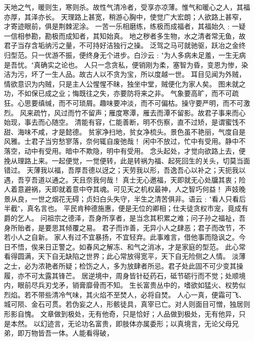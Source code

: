 \documentclass[12pt,UTF8]{ctexbook}
\begin{document}
天地之气，暖则生，寒则杀。故性气清冷者，受享亦凉薄。惟气和暖心之人，其福亦厚，其泽亦长。
天理路上甚宽，稍游心胸中，使觉广大宏朗；人欲路上甚窄，才寄迹眼前，俱是荆棘泥涂。
一苦一乐相磨练，练极而成福者，其福始久﹕一疑一信相参勘，勘极而成知者，其知始真。
地之秽者多生物，水之清者常无鱼，故君子当存含垢纳污之量，不可持好洁独行之操。
泛驾之马可就驰驱，跃冶之金终归型范。只一优游不振，便终身无个进步。白沙云﹕"为人多病未足羞，一生无病是吾忧。"真确实之论也。
人只一念贪私，便销刚为柔，塞智为昏，变恩为惨，染洁为污，坏了一生人品。故古人以不贪为宝，所以度越一世。
耳目见闻为外贼，情欲意识为内贼，只是主人公惺惺不昧，独坐中堂，贼便化为家人矣。
图未就之功，不如保已成之业；悔既往之失，亦要防将来之非。
气象要高旷，而不可疏狂。心思要缜缄，而不可琐屑。趣味要冲淡，而不可偏枯。操守要严明，而不可激烈。
风来疏竹，风过而竹不留声；雁度寒潭，雁去而潭不留影。故君子事来而心始现，事去而心随空。
清能有容，仁能善断，明不伤察，直不过矫，是谓蜜饯不甜、海味不咸，才是懿德。
贫家净扫地，贫女净梳头。景色虽不艳丽，气度自是风雅。士君子当穷愁寥落，奈何辄自废弛哉！
闲中不放过，忙中有受用。静中不落空，动中有受用。暗中不欺隐，明中有受用。
念头起处，才觉向欲路上去，便挽从理路上来。一起便觉，一觉便转，此是转祸为福、起死回生的关头，切莫当面错过。
天薄我以福，吾厚吾德以迓之；天劳我以形，吾逸吾心以补之；天扼我以遇，吾亨吾道以通之。天且奈我何哉！
真士无心邀福，天即就无心处牖其衷；险人着意避祸，天即就着意中夺其魂。可见天之机权最神，人之智巧何益！
声妓晚景从良，一世之烟花无碍；贞妇白头失守，半生之清苦俱非。语云﹕"看人只看后半截"，真名言也。
平民肯种德施惠，便是无位的卿相；仕夫徒贪权市宠，竟成有爵的乞人。
问祖宗之德泽，吾身所享者，是当念其积累之难；问子孙之福祉，吾身所贻者，是要思其倾覆之易。
君子而诈善，无异小人之肆恶；君子而改节，不若小人之自新。
家人有过不宜暴扬，不宜轻弃。此事难言，借他事而隐讽之。今日不悟，俟来日正警之。如春风之解冻、和气之消冰，才是家庭的型范。
此心常看得圆满，天下自无缺陷之世界；此心常放得宽平，天下自无险侧之人情。
淡薄之士，必为浓艳者所疑；检饬之人，多为放肆者所忌。君子处此固不可少变其操履，亦不可太露其锋芒。
居逆境中，周身皆针砭药石，砥节砺行而不觉；处顺境内，眼前尽兵刃戈矛，销膏靡骨而不知。
生长富贵丛中的，嗜欲如猛火、权势似烈焰。若不带些清冷气味，其火焰不至焚人，必将自焚。
人心一真，便霜可飞、城可陨、金石可贯。若伪妄之人，形骸徒具，真宰已亡。对人则面目可憎，独居则形影自愧。
文章做到极处，无有他奇，只是恰好；人品做到极处，无有他异，只是本然。
以幻迹言，无论功名富贵，即肢体亦属委形；以真境言，无论父母兄弟，即万物皆吾一体。人能看得破，
\end{document}
